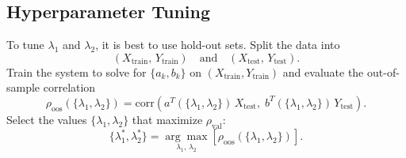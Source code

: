 \documentclass[11pt]{article}
\begin{document}
\subsection{Hyperparameter Tuning}

To tune $\lambda_1$ and $\lambda_2$, it is best to use hold-out sets. Split the data into
\[
    (X_{\mathrm{train}},\, Y_{\mathrm{train}}) \quad \text{and} \quad (X_{\mathrm{test}},\, Y_{\mathrm{test}}).
\]
Train the system to solve for $\{a_k, b_k\}$ on $(X_{\mathrm{train}}, Y_{\mathrm{train}})$ and evaluate the out-of-sample correlation
\[
    \rho_{\mathrm{oos}}(\{\lambda_1, \lambda_2\})
    = \mathrm{corr}\!\left(a^T(\{\lambda_1, \lambda_2\})\,X_{\mathrm{test}},\;
                           b^T(\{\lambda_1, \lambda_2\})\,Y_{\mathrm{test}}\right).
\]
Select the values $\{\lambda_1, \lambda_2\}$ that maximize $\rho_{\mathrm{val}}$:
\begin{equation}
    \{\lambda_1^*, \lambda_2^*\} = \underset{\lambda_1,\,\lambda_2}{\arg\max}
    \left[\rho_{\mathrm{oos}}(\{\lambda_1, \lambda_2\})\right].
\end{equation}



\end{document}
